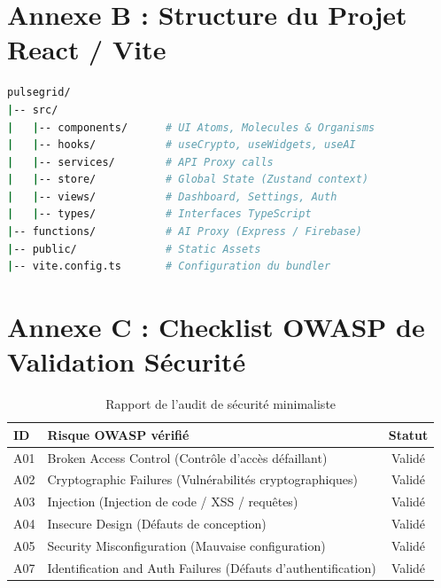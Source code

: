 ﻿\documentclass[12pt,a4paper,oneside]{report} %
\begin{document}
\section*{Annexe B : Structure du Projet React / Vite}
\begin{lstlisting}[language=bash]
pulsegrid/
|-- src/
|   |-- components/      # UI Atoms, Molecules & Organisms
|   |-- hooks/           # useCrypto, useWidgets, useAI
|   |-- services/        # API Proxy calls
|   |-- store/           # Global State (Zustand context)
|   |-- views/           # Dashboard, Settings, Auth
|   |-- types/           # Interfaces TypeScript
|-- functions/           # AI Proxy (Express / Firebase)
|-- public/              # Static Assets
|-- vite.config.ts       # Configuration du bundler
\end{lstlisting}

\section*{Annexe C : Checklist OWASP de Validation Sécurité}
\begin{table}[H]
\centering
\begin{tabularx}{\textwidth}{|l|X|c|}
\hline
\textbf{ID} & \textbf{Risque OWASP vérifié} & \textbf{Statut} \\ \hline
A01 & Broken Access Control (Contrôle d'accès défaillant) & Validé \\ \hline
A02 & Cryptographic Failures (Vulnérabilités cryptographiques) & Validé \\ \hline
A03 & Injection (Injection de code / XSS / requêtes) & Validé \\ \hline
A04 & Insecure Design (Défauts de conception) & Validé \\ \hline
A05 & Security Misconfiguration (Mauvaise configuration) & Validé \\ \hline
A07 & Identification and Auth Failures (Défauts d'authentification) & Validé \\ \hline
\end{tabularx}
\caption{Rapport de l'audit de sécurité minimaliste}
\end{table}
\end{document}
